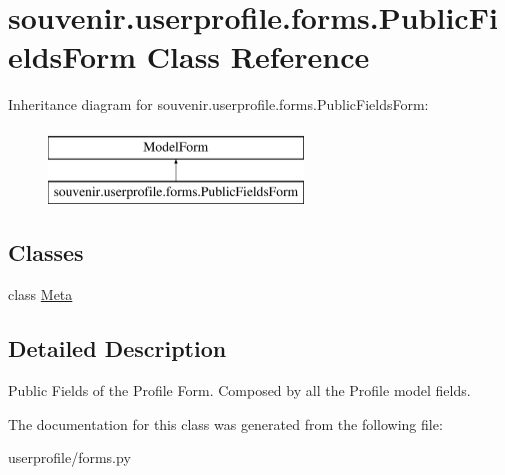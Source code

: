 \hypertarget{classsouvenir_1_1userprofile_1_1forms_1_1PublicFieldsForm}{\section{souvenir.\-userprofile.\-forms.\-Public\-Fields\-Form Class Reference}
\label{classsouvenir_1_1userprofile_1_1forms_1_1PublicFieldsForm}
}
Inheritance diagram for souvenir.\-userprofile.\-forms.\-Public\-Fields\-Form\-:\begin{figure}[H]
\begin{center}
\leavevmode
\includegraphics[height=2.000000cm]{classsouvenir_1_1userprofile_1_1forms_1_1PublicFieldsForm}
\end{center}
\end{figure}
\subsection*{Classes}
\begin{DoxyCompactItemize}
\item 
class \hyperlink{classsouvenir_1_1userprofile_1_1forms_1_1PublicFieldsForm_1_1Meta}{Meta}
\end{DoxyCompactItemize}


\subsection{Detailed Description}
\begin{DoxyVerb}Public Fields of the Profile Form. Composed by all the Profile model fields.
\end{DoxyVerb}
 

The documentation for this class was generated from the following file\-:\begin{DoxyCompactItemize}
\item 
userprofile/forms.\-py\end{DoxyCompactItemize}
